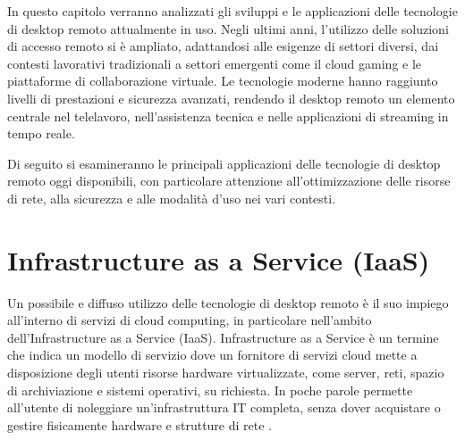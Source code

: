 \documentclass[12pt,a4paper,openright,twoside]{book}
\begin{document}
In questo capitolo verranno analizzati gli sviluppi e le applicazioni delle tecnologie di desktop remoto attualmente in uso. Negli ultimi anni, l'utilizzo delle soluzioni di accesso remoto si è ampliato, adattandosi alle esigenze di settori diversi, dai contesti lavorativi tradizionali a settori emergenti come il cloud gaming e le piattaforme di collaborazione virtuale. Le tecnologie moderne hanno raggiunto livelli di prestazioni e sicurezza avanzati, rendendo il desktop remoto un elemento centrale nel telelavoro, nell'assistenza tecnica e nelle applicazioni di streaming in tempo reale.

Di seguito si esamineranno le principali applicazioni delle tecnologie di desktop remoto oggi disponibili, con particolare attenzione all’ottimizzazione delle risorse di rete, alla sicurezza e alle modalità d'uso nei vari contesti.

\section{Infrastructure as a Service (IaaS)}
\label{sec:iaas}
Un possibile e diffuso utilizzo delle tecnologie di desktop remoto è il suo impiego all'interno di servizi di cloud computing, in particolare nell'ambito dell'Infrastructure as a Service (IaaS).
Infrastructure as a Service è un termine che indica un modello di servizio dove un fornitore di servizi cloud mette a disposizione degli utenti risorse hardware virtualizzate, come server, reti, spazio di archiviazione e sistemi operativi, su richiesta. In poche parole permette all'utente di noleggiare un'infrastruttura IT completa, senza dover acquistare o gestire fisicamente hardware e strutture di rete \cite{bhardwaj2010cloud}.
\end{document}
